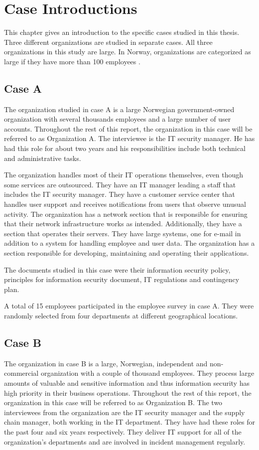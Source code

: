 \chapter{Case Introductions}
\label{chp:CaseIntroductions}
This chapter gives an introduction to the specific cases studied in this thesis. Three  different organizations are studied in separate cases. All three organizations in this study are large. In Norway, organizations are categorized as large if they have more than 100 employees \cite{SMB}. 

\section{Case A}
The organization studied in case A is a large Norwegian government-owned organization with several thousands employees and a large number of user accounts. Throughout the rest of this report, the organization in this case will be referred to as Organization A. The interviewee is the IT security manager. He has had this role for about two years and his responsibilities include both technical and administrative tasks. 

The organization handles most of their IT operations themselves, even though some services are outsourced. They have an IT manager leading a staff that includes the IT security manager. They have a customer service center that handles user support and receives notifications from users that observe unusual activity. The organization has a network section that is responsible for ensuring that their network infrastructure works as intended. Additionally, they have a section that operates their servers. They have large systems, one for e-mail in addition to a system for handling employee and user data. The organization has a section responsible for developing, maintaining and operating their applications.

The documents studied in this case were their information security policy, principles for information security document, IT regulations and contingency plan.

A total of 15 employees participated in the employee survey in case A. They were randomly selected from four departments at different geographical locations. 

\section{Case B}
The organization in case B is a large, Norwegian, independent and non-commercial organization with a couple of thousand employees. They process large amounts of valuable and sensitive information and thus information security has high priority in their business operations. Throughout the rest of this report, the organization in this case will be referred to as Organization B. The two interviewees from the organization are the IT security manager and the supply chain manager, both working in the IT department. They have had these roles for the past four and six years respectively. They deliver IT support for all of the organization's departments and are involved in incident management regularly.   

